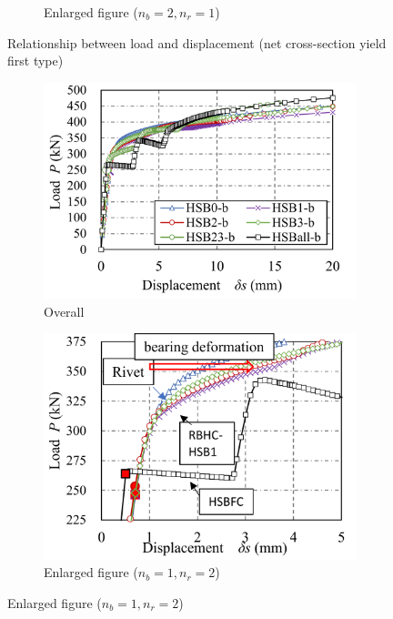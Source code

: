 \begin{figure}
\begin{subfigure}[t]{0.48\textwidth}
    \caption{Enlarged figure ($n_b=2, n_r=1$)}
    \label{ch4fig11-c}
    \end{subfigure}
    \caption{Relationship between load and displacement (net cross-section yield first type)}
    \label{ch4fig11}
\end{figure}

\begin{figure}
    \centering
    \begin{subfigure}[t]{0.76\textwidth}
    \includegraphics[width=\linewidth]{imgs/ch4/fig12-a.pdf}
    \caption{Overall}
    \label{ch4fig12-a}
    \end{subfigure}
    \begin{subfigure}[t]{0.48\textwidth}
    \includegraphics[width=\linewidth]{imgs/ch4/fig12-b.pdf}
    \caption{Enlarged figure ($n_b=1, n_r=2$)}

\end{subfigure}
\end{figure}
